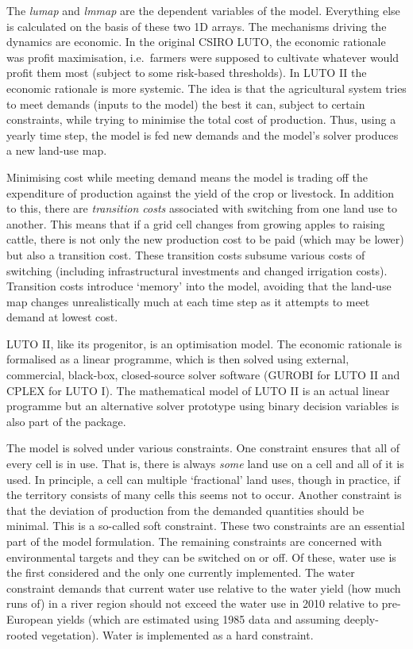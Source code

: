 \documentclass{draft}
\begin{document}
The \emph{lumap} and \emph{lmmap} are the dependent variables of the model. Everything else is calculated on the basis of these two 1D arrays. The mechanisms driving the dynamics are economic. In the original CSIRO LUTO, the economic rationale was profit maximisation, i.e.\ farmers were supposed to cultivate whatever would profit them most (subject to some risk-based thresholds). In LUTO II the economic rationale is more systemic. The idea is that the agricultural system tries to meet demands (inputs to the model) the best it can, subject to certain constraints, while trying to minimise the total cost of production. Thus, using a yearly time step, the model is fed new demands and the model's solver produces a new land-use map.

Minimising cost while meeting demand means the model is trading off the expenditure of production against the yield of the crop or livestock. In addition to this, there are \emph{transition costs} associated with switching from one land use to another. This means that if a grid cell changes from growing apples to raising cattle, there is not only the new production cost to be paid (which may be lower) but also a transition cost. These transition costs subsume various costs of switching (including infrastructural investments and changed irrigation costs). Transition costs introduce `memory' into the model, avoiding that the land-use map changes unrealistically much at each time step as it attempts to meet demand at lowest cost.

LUTO II, like its progenitor, is an optimisation model. The economic rationale is formalised as a linear programme, which is then solved using external, commercial, black-box, closed-source solver software (GUROBI for LUTO II and CPLEX for LUTO I). The mathematical model of LUTO II is an actual linear programme but an alternative solver prototype using binary decision variables is also part of the package.

The model is solved under various constraints. One constraint ensures that all of every cell is in use. That is, there is always \emph{some} land use on a cell and all of it is used. In principle, a cell can multiple `fractional' land uses, though in practice, if the territory consists of many cells this seems not to occur. Another constraint is that the deviation of production from the demanded quantities should be minimal. This is a so-called soft constraint. These two constraints are an essential part of the model formulation. The remaining constraints are concerned with environmental targets and they can be switched on or off. Of these, water use is the first considered and the only one currently implemented. The water constraint demands that current water use relative to the water yield (how much runs of) in a river region should not exceed the water use in 2010 relative to pre-European yields (which are estimated using 1985 data and assuming deeply-rooted vegetation). Water is implemented as a hard constraint.
\end{document}
